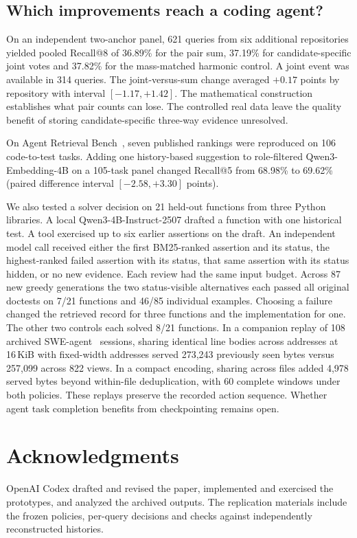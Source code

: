 \documentclass[conference]{IEEEtran}
\begin{document}
\subsection{Which improvements reach a coding agent?}
On an independent two-anchor panel, 621 queries from six additional repositories yielded pooled Recall@8 of 36.89\% for the pair sum, 37.19\% for candidate-specific joint votes and 37.82\% for the mass-matched harmonic control. A joint event was available in 314 queries. The joint-versus-sum change averaged $+0.17$ points by repository with interval $[-1.17,+1.42]$. The mathematical construction establishes what pair counts can lose. The controlled real data leave the quality benefit of storing candidate-specific three-way evidence unresolved.

On Agent Retrieval Bench~\cite{arb}, seven published rankings were reproduced on 106 code-to-test tasks. Adding one history-based suggestion to role-filtered Qwen3-Embedding-4B on a 105-task panel changed Recall@5 from 68.98\% to 69.62\% (paired difference interval $[-2.58,+3.30]$ points).

We also tested a solver decision on 21 held-out functions from three Python libraries. A local Qwen3-4B-Instruct-2507 drafted a function with one historical test. A tool exercised up to six earlier assertions on the draft. An independent model call received either the first BM25-ranked assertion and its status, the highest-ranked failed assertion with its status, that same assertion with its status hidden, or no new evidence. Each review had the same input budget. Across 87 new greedy generations the two status-visible alternatives each passed all original doctests on 7/21 functions and 46/85 individual examples. Choosing a failure changed the retrieved record for three functions and the implementation for one. The other two controls each solved 8/21 functions. In a companion replay of 108 archived SWE-agent~\cite{sweagent} sessions, sharing identical line bodies across addresses at 16\,KiB with fixed-width addresses served 273,243 previously seen bytes versus 257,099 across 822 views. In a compact encoding, sharing across files added 4,978 served bytes beyond within-file deduplication, with 60 complete windows under both policies. These replays preserve the recorded action sequence. Whether agent task completion benefits from checkpointing remains open.

\section*{Acknowledgments}
OpenAI Codex drafted and revised the paper, implemented and exercised the prototypes, and analyzed the archived outputs. The replication materials include the frozen policies, per-query decisions and checks against independently reconstructed histories.



\end{document}
